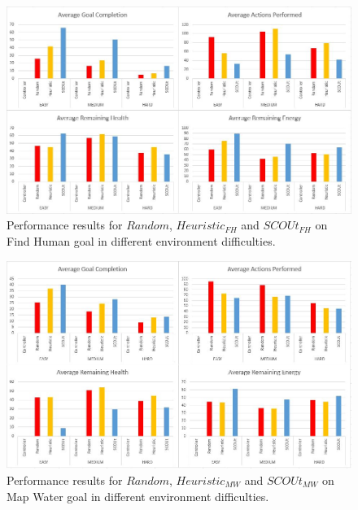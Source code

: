 \begin{figure}[h]
  \includegraphics[width=1.0\columnwidth]{Figures/Results/Experiment1/FindHuman.JPG}
  \caption{Performance results for $Random$, $Heuristic_{FH}$ and $SCOUt_{FH}$ on Find Human goal in different environment difficulties.}
  \label{fig:findhuman_test_results}
\end{figure}



\begin{figure}[h]
  \includegraphics[width=1.0\columnwidth]{Figures/Results/Experiment1/MapWater.JPG}
  \caption{Performance results for $Random$, $Heuristic_{MW}$ and $SCOUt_{MW}$ on Map Water goal in different environment difficulties.}
  \label{fig:mapwater_test_results}
\end{figure}



